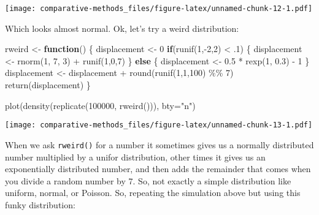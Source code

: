 \documentclass[
]{article}
\newenvironment{Shaded}{\begin{snugshade}}{\end{snugshade}}
\newcommand{\AttributeTok}[1]{\textcolor[rgb]{0.77,0.63,0.00}{#1}}
\newcommand{\ControlFlowTok}[1]{\textcolor[rgb]{0.13,0.29,0.53}{\textbf{#1}}}
\newcommand{\DecValTok}[1]{\textcolor[rgb]{0.00,0.00,0.81}{#1}}
\newcommand{\FloatTok}[1]{\textcolor[rgb]{0.00,0.00,0.81}{#1}}
\newcommand{\FunctionTok}[1]{\textcolor[rgb]{0.00,0.00,0.00}{#1}}
\newcommand{\NormalTok}[1]{#1}
\newcommand{\OtherTok}[1]{\textcolor[rgb]{0.56,0.35,0.01}{#1}}
\newcommand{\SpecialCharTok}[1]{\textcolor[rgb]{0.00,0.00,0.00}{#1}}
\newcommand{\StringTok}[1]{\textcolor[rgb]{0.31,0.60,0.02}{#1}}
\begin{document}
\texttt{[image: comparative-methods\_files/figure-latex/unnamed-chunk-12-1.pdf]}

Which looks almost normal. Ok, let's try a weird distribution:

\begin{Shaded}
\begin{Highlighting}[]
\NormalTok{rweird }\OtherTok{\textless{}{-}} \ControlFlowTok{function}\NormalTok{() \{}
\NormalTok{  displacement }\OtherTok{\textless{}{-}} \DecValTok{0}
  \ControlFlowTok{if}\NormalTok{(}\FunctionTok{runif}\NormalTok{(}\DecValTok{1}\NormalTok{,}\SpecialCharTok{{-}}\DecValTok{2}\NormalTok{,}\DecValTok{2}\NormalTok{) }\SpecialCharTok{\textless{}}\NormalTok{ .}\DecValTok{1}\NormalTok{) \{}
\NormalTok{    displacement }\OtherTok{\textless{}{-}} \FunctionTok{rnorm}\NormalTok{(}\DecValTok{1}\NormalTok{, }\DecValTok{7}\NormalTok{, }\DecValTok{3}\NormalTok{) }\SpecialCharTok{+} \FunctionTok{runif}\NormalTok{(}\DecValTok{1}\NormalTok{,}\DecValTok{0}\NormalTok{,}\DecValTok{7}\NormalTok{)}
\NormalTok{  \} }\ControlFlowTok{else}\NormalTok{ \{}
\NormalTok{    displacement }\OtherTok{\textless{}{-}} \FloatTok{0.5} \SpecialCharTok{*} \FunctionTok{rexp}\NormalTok{(}\DecValTok{1}\NormalTok{, }\FloatTok{0.3}\NormalTok{) }\SpecialCharTok{{-}} \DecValTok{1}
\NormalTok{  \}}
\NormalTok{  displacement }\OtherTok{\textless{}{-}}\NormalTok{ displacement }\SpecialCharTok{+} \FunctionTok{round}\NormalTok{(}\FunctionTok{runif}\NormalTok{(}\DecValTok{1}\NormalTok{,}\DecValTok{1}\NormalTok{,}\DecValTok{100}\NormalTok{) }\SpecialCharTok{\%\%} \DecValTok{7}\NormalTok{)}
  \FunctionTok{return}\NormalTok{(displacement)  }
\NormalTok{\}}

\FunctionTok{plot}\NormalTok{(}\FunctionTok{density}\NormalTok{(}\FunctionTok{replicate}\NormalTok{(}\DecValTok{100000}\NormalTok{, }\FunctionTok{rweird}\NormalTok{())), }\AttributeTok{bty=}\StringTok{"n"}\NormalTok{)}
\end{Highlighting}
\end{Shaded}

\texttt{[image: comparative-methods\_files/figure-latex/unnamed-chunk-13-1.pdf]}

When we ask \texttt{rweird()} for a number it sometimes gives us a normally distributed number multiplied by a unifor distribution, other times it gives us an exponentially distributed number, and then adds the remainder that comes when you divide a random number by 7. So, not exactly a simple distribution like uniform, normal, or Poisson. So, repeating the simulation above but using this funky distribution:
\end{document}
